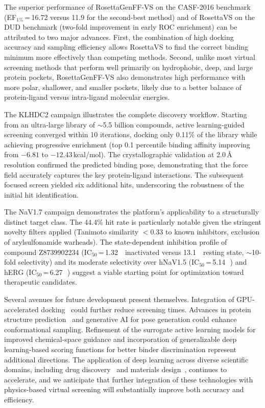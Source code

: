 \documentclass[11pt]{article}
\begin{document}
The superior performance of RosettaGenFF-VS on the CASF-2016 benchmark (EF$_{1\%}$\,=\,16.72 versus 11.9 for the second-best method) and of RosettaVS on the DUD benchmark (two-fold improvement in early ROC enrichment) can be attributed to two major advances. First, the combination of high docking accuracy and sampling efficiency allows RosettaVS to find the correct binding minimum more effectively than competing methods. Second, unlike most virtual screening methods that perform well primarily on hydrophobic, deep, and large protein pockets, RosettaGenFF-VS also demonstrates high performance with more polar, shallower, and smaller pockets, likely due to a better balance of protein-ligand versus intra-ligand molecular energies.

The KLHDC2 campaign illustrates the complete discovery workflow. Starting from an ultra-large library of ${\sim}$5.5 billion compounds, active learning-guided screening converged within 10 iterations, docking only 0.11\% of the library while achieving progressive enrichment (top 0.1 percentile binding affinity improving from $-6.81$ to $-12.43$\,kcal/mol). The crystallographic validation at 2.0\,\AA{} resolution confirmed the predicted binding pose, demonstrating that the force field accurately captures the key protein-ligand interactions. The subsequent focused screen yielded six additional hits, underscoring the robustness of the initial hit identification.

The NaV1.7 campaign demonstrates the platform's applicability to a structurally distinct target class. The 44.4\% hit rate is particularly notable given the stringent novelty filters applied (Tanimoto similarity $<$0.33 to known inhibitors, exclusion of arylsulfonamide warheads). The state-dependent inhibition profile of compound Z8739902234 (IC$_{50}$\,=\,1.32\,\si{\micro\molar} inactivated versus 13.1\,\si{\micro\molar} resting state, ${\sim}$10-fold selectivity) and its moderate selectivity over hNaV1.5 (IC$_{50}$\,=\,5.14\,\si{\micro\molar}) and hERG (IC$_{50}$\,=\,6.27\,\si{\micro\molar}) suggest a viable starting point for optimization toward therapeutic candidates.

Several avenues for future development present themselves. Integration of GPU-accelerated docking~\citep{gpu_docking2023} could further reduce screening times. Advances in protein structure prediction~\citep{jumper2021alphafold,baek2021rosettafold,krishna2024rosettafoldaa} and generative AI for pose generation could enhance conformational sampling. Refinement of the surrogate active learning models for improved chemical-space guidance and incorporation of generalizable deep learning-based scoring functions for better binder discrimination represent additional directions. The application of deep learning across diverse scientific domains, including drug discovery~\citep{stokes2020deep,schneider2020generative} and materials design~\citep{materials_ai2023}, continues to accelerate, and we anticipate that further integration of these technologies with physics-based virtual screening will substantially improve both accuracy and efficiency.
\end{document}

